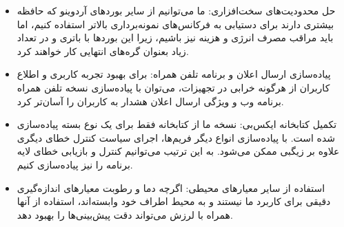 \begin{itemize}
\item حل محدودیت‌های سخت‌افزاری: ما می‌توانیم از سایر بوردهای آردوینو که حافظه بیشتری دارند برای دستیابی به فرکانس‌های نمونه‌برداری بالاتر استفاده کنیم، اما باید مراقب مصرف انرژی و هزینه نیز باشیم، زیرا این بوردها با باتری و در تعداد زیاد بعنوان گره‌های انتهایی کار خواهند کرد.
\item پیاده‌سازی ارسال اعلان و برنامه تلفن همراه: برای بهبود تجربه کاربری و اطلاع کاربران از هرگونه خرابی در تجهیزات، می‌توان با پیاده‌سازی نسخه تلفن همراه برنامه وب و ویژگی ارسال اعلان هشدار به کاربران را آسان‌تر کرد.
\item تکمیل کتابخانه ایکس‌بی: نسخه ما از کتابخانه فقط برای یک نوع بسته پیاده‌سازی شده است. با پیاده‌سازی انواع دیگر فریم‌ها، اجرای سیاست کنترل خطای دیگری علاوه بر زیگبی ممکن می‌شود. به این ترتیب می‌توانیم کنترل و بازیابی خطای لایه برنامه را نیز پیاده‌سازی کنیم.
\item استفاده از سایر معیارهای محیطی: اگرچه دما و رطوبت معیارهای اندازه‌گیری دقیقی برای کاربرد ما نیستند و به محیط اطراف خود وابسته‌اند، استفاده از آنها همراه با لرزش می‌تواند دقت پیش‌بینی‌ها را بهبود دهد.
\end{itemize}